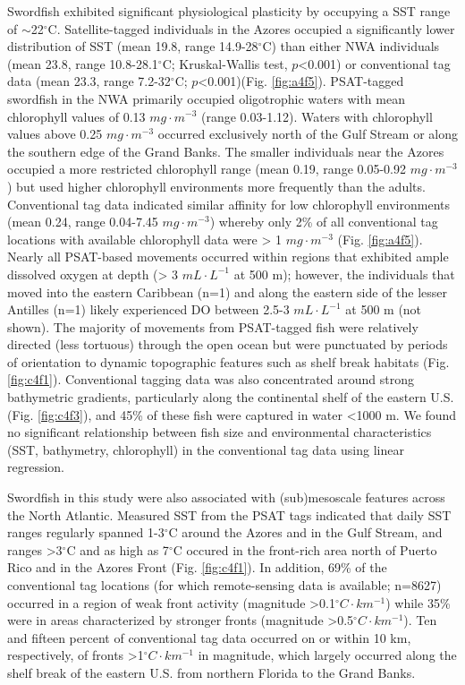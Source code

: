 Swordfish exhibited significant physiological plasticity by occupying a SST range of $\sim$22$^{\circ}$C. Satellite-tagged individuals in the Azores occupied a significantly lower distribution of SST (mean 19.8, range 14.9-28$^{\circ}$C) than either NWA individuals (mean 23.8, range 10.8-28.1$^{\circ}$C; Kruskal-Wallis test, \(p\)<0.001) or conventional tag data (mean 23.3, range 7.2-32$^{\circ}$C; \(p\)<0.001)(Fig. \ref{fig:a4f5}). PSAT-tagged swordfish in the NWA primarily occupied oligotrophic waters with mean chlorophyll values of 0.13 \(mg \cdot m^{-3}\) (range 0.03-1.12). Waters with chlorophyll values above 0.25 \(mg \cdot m^{-3}\) occurred exclusively north of the Gulf Stream or along the southern edge of the Grand Banks. The smaller individuals near the Azores occupied a more restricted chlorophyll range (mean 0.19, range 0.05-0.92 \(mg \cdot m^{-3}\)) but used higher chlorophyll environments more frequently than the adults. Conventional tag data indicated similar affinity for low chlorophyll environments (mean 0.24, range 0.04-7.45 $mg \cdot m^{-3}$) whereby only 2\% of all conventional tag locations with available chlorophyll data were > 1 \(mg \cdot m^{-3}\) (Fig. \ref{fig:a4f5}). Nearly all PSAT-based movements occurred within regions that exhibited ample dissolved oxygen at depth (> 3 \(mL \cdot L^{-1}\) at 500 m); however, the individuals that moved into the eastern Caribbean (n=1) and along the eastern side of the lesser Antilles (n=1) likely experienced DO between 2.5-3 \(mL \cdot L^{-1}\) at 500 m (not shown). The majority of movements from PSAT-tagged fish were relatively directed (\eg less tortuous) through the open ocean but were punctuated by periods of orientation to dynamic topographic features such as shelf break habitats (Fig. \ref{fig:c4f1}). Conventional tagging data was also concentrated around strong bathymetric gradients, particularly along the continental shelf of the eastern U.S. (Fig. \ref{fig:c4f3}), and 45\% of these fish were captured in water <1000 m. We found no significant relationship between fish size and environmental characteristics (SST, bathymetry, chlorophyll) in the conventional tag data using linear regression.

Swordfish in this study were also associated with (sub)mesoscale features across the North Atlantic. Measured SST from the PSAT tags indicated that daily SST ranges regularly spanned 1-3$^{\circ}$C around the Azores and in the Gulf Stream, and ranges >3$^{\circ}$C and as high as 7$^{\circ}$C occured in the front-rich area north of Puerto Rico and in the Azores Front (Fig. \ref{fig:c4f1}). In addition, 69\% of the conventional tag locations (for which remote-sensing data is available; n=8627) occurred in a region of weak front activity (magnitude >0.1$^{\circ}C \cdot km ^{-1}$) while 35\% were in areas characterized by stronger fronts (magnitude >0.5$^{\circ}C \cdot km ^{-1}$). Ten and fifteen percent of conventional tag data occurred on or within 10 km, respectively, of fronts >1$^{\circ}C \cdot km ^{-1}$ in magnitude, which largely occurred along the shelf break of the eastern U.S. from northern Florida to the Grand Banks.

